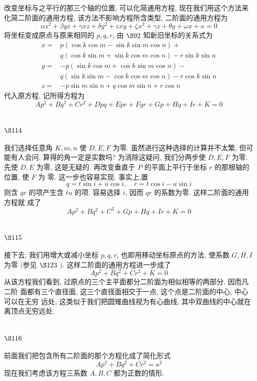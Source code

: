 改变坐标与之平行的那三个轴的位置, 可以化简通用方程, 现在我们用这个方法来 化简二阶面的通用方程, 该方法不影响方程所含类型, 二阶面的通用方程为
\[
\alpha z^{2}+\beta y z+\gamma x z+\delta y^{2}+\varepsilon x y+\zeta x^{2}+\gamma z+\theta y+\omega x+\kappa=0
\]
将坐标变成原点与原来相同的 $p, q, r$, 由 $\S 92$ 知新旧坐标的关系式为
\[
\begin{aligned}
x= & p(\cos k \cos m-\sin k \sin m \cos n)+ \\
& q(\cos k \sin m+\sin k \cos m \cos n)-r \sin k \sin n \\
y= & -p(\sin k \cos m+\cos k \sin m \cos n)- \\
& q(\sin k \sin m-\cos k \cos m \cos n)-r \cos k \sin n \\
z= & -p \sin m \sin n+q \cos m \sin n+r \cos n
\end{aligned}
\]
代入原方程, 记所得方程为
\[
A p^{2}+B q^{2}+C r^{2}+D p q+E p r+F q r+G p+H q+I r+K=0
\]
\section{$\S 114$}

我们选择任意角 $K, m, n$ 使 $D, E, F$ 为零. 虽然进行这种选择的计算并不太繁, 但可 能有人会问, 算得的角一定是实数吗? 为消除这疑问, 我们分两步使 $D, E, F$ 为零. 先使 $D, E$ 为零, 这是无疑的. 再改变垂直于 $P$ 的平面上平行于坐标 $r$ 的那根轴的位置, 使 $F$ 为 零. 这一步也容易实现. 事实上,置
\[
q=t \sin i+u \cos i, \quad r=t \cos i-u \sin i
\]
则含 $q r$ 的项产生含 $t u$ 的项. 容易选择 $i$, 因而 $q r$ 的系数为零. 这样二阶面的通用方程就 成了
\[
A p^{2}+B q^{2}+C^{2}+G p+H q+I r+K=0
\]
\section{$\S 115$}

接下去, 我们用增大或减小坐标 $p, q, r$, 也即用移动坐标原点的方法, 使系数 $G, H, I$ 为零 (参见 $\S 123$ ). 这样二阶面的通用方程进一步成了
\[
A p^{2}+B q^{2}+C r^{2}+K=0
\]
从该方程我们看到, 过原点的三个主平面都分二阶面为相似相等的两部分. 因而凡二阶 面都有三个直径面, 这三个直径面相交于一点, 这个点是二阶面的中心, 中心可以在无穷 远处, 这类似于我们把圆雉曲线视为有心曲线, 其中双曲线的中心就在离顶点无穷远处.

\section{$\S 116$}

前面我们把包含所有二阶面的那个方程化成了简化形式
\[
A p^{2}+B q^{2}+C r^{2}=a^{2}
\]
现在我们考虑该方程三系数 $A, B, C$ 都为正数的情形.

